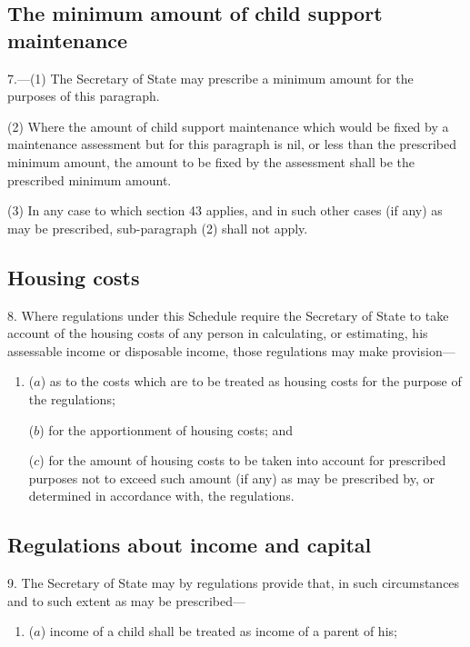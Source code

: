 \documentclass[12pt,a4paper]{article}
\begin{document}
{\subsection*{The minimum amount of child support maintenance}

7.---(1) The Secretary of State may prescribe a minimum amount for the purposes of this paragraph.

(2) Where the amount of child support maintenance which would be fixed by a maintenance assessment but for this paragraph is nil, or less than the prescribed minimum amount, the amount to be fixed by the assessment shall be the prescribed minimum amount.

(3) In any case to which section 43 applies, and in such other cases (if any) as may be prescribed, sub-paragraph (2) shall not apply.

\subsection*{Housing costs}

8. Where regulations under this Schedule require the Secretary of State to take account of the housing costs of any person in calculating, or estimating, his assessable income or disposable income, those regulations may make provision---
\begin{enumerate}\item[]
($a$) as to the costs which are to be treated as housing costs for the purpose of the regulations;

($b$) for the apportionment of housing costs; and

($c$) for the amount of housing costs to be taken into account for prescribed purposes not to exceed such amount (if any) as may be prescribed by, or determined in accordance with, the regulations.
\end{enumerate}


\subsection*{Regulations about income and capital}

9. The Secretary of State may by regulations provide that, in such circumstances and to such extent as may be prescribed---
\begin{enumerate}\item[]
($a$) income of a child shall be treated as income of a parent of his;


\end{enumerate}}
\end{document}
